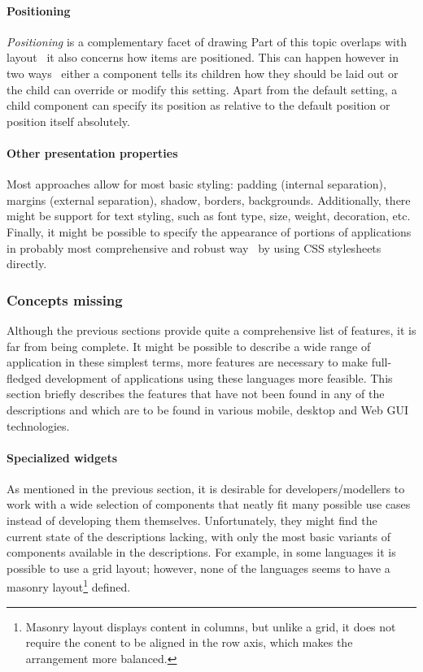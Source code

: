 \paragraph{Positioning}
\emph{Positioning} is a complementary facet of drawing
Part of this topic overlaps with layout \textendash\ it also concerns how items are positioned.
This can happen however in two ways \textendash\ either a component tells its children how they should be laid out or the child can override or modify this setting.
Apart from the default setting, a child component can specify its position as relative to the default position or position itself absolutely.

\paragraph{Other presentation properties}
Most approaches allow for most basic styling: padding (internal separation), margins (external separation), shadow, borders, backgrounds.
Additionally, there might be support for text styling, such as font type, size, weight, decoration, etc.
Finally, it might be possible to specify the appearance of portions of applications in probably most comprehensive and robust way \textendash\ by using CSS stylesheets directly.

\subsubsection{Concepts missing}

Although the previous sections provide quite a comprehensive list of features, it is far from being complete.
It might be possible to describe a wide range of application in these simplest terms, more features are necessary to make full-fledged development of applications using these languages more feasible.
This section briefly describes the features that have not been found in any of the descriptions and which are to be found in various mobile, desktop and Web GUI technologies.

\paragraph{Specialized widgets}
As mentioned in the previous section, it is desirable for developers/modellers to work with a wide selection of components that neatly fit many possible use cases instead of developing them themselves.
Unfortunately, they might find the current state of the descriptions lacking, with only the most basic variants of components available in the descriptions.
For example, in some languages it is possible to use a grid layout;
however, none of the languages seems to have a masonry layout\footnote{Masonry layout displays content in columns, but unlike a grid, it does not require the conent to be aligned in the row axis, which makes the arrangement more balanced.} defined.

